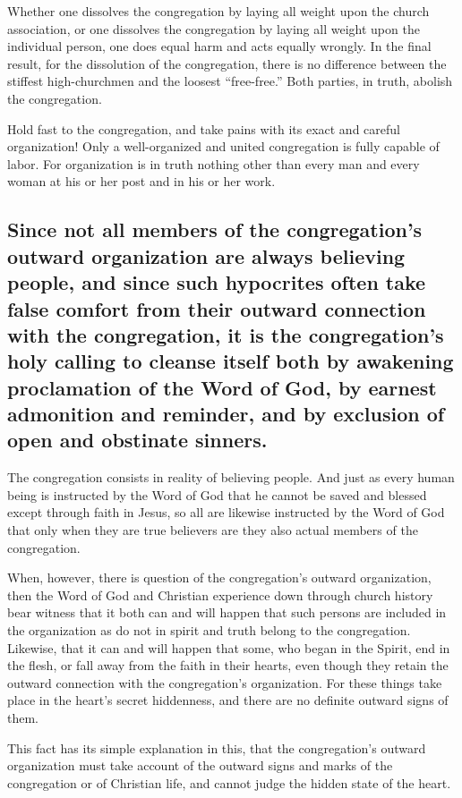 Whether one dissolves the congregation by laying all weight upon the church association, or one dissolves the congregation by laying all weight upon the individual person, one does equal harm and acts equally wrongly. In the final result, for the dissolution of the congregation, there is no difference between the stiffest high-churchmen and the loosest “free-free.” Both parties, in truth, abolish the congregation.

Hold fast to the congregation, and take pains with its exact and careful organization! Only a well-organized and united congregation is fully capable of labor. For organization is in truth nothing other than every man and every woman at his or her post and in his or her work.






\subsection{Since not all members of the congregation’s outward organization are always believing people, and since such hypocrites often take false comfort from their outward connection with the congregation, it is the congregation’s holy calling to cleanse itself both by awakening proclamation of the Word of God, by earnest admonition and reminder, and by exclusion of open and obstinate sinners.}

The congregation consists in reality of believing people. And just as every human being is instructed by the Word of God that he cannot be saved and blessed except through faith in Jesus, so all are likewise instructed by the Word of God that only when they are true believers are they also actual members of the congregation.

When, however, there is question of the congregation’s outward organization, then the Word of God and Christian experience down through church history bear witness that it both can and will happen that such persons are included in the organization as do not in spirit and truth belong to the congregation. Likewise, that it can and will happen that some, who began in the Spirit, end in the flesh, or fall away from the faith in their hearts, even though they retain the outward connection with the congregation’s organization. For these things take place in the heart’s secret hiddenness, and there are no definite outward signs of them.

This fact has its simple explanation in this, that the congregation’s outward organization must take account of the outward signs and marks of the congregation or of Christian life, and cannot judge the hidden state of the heart.

